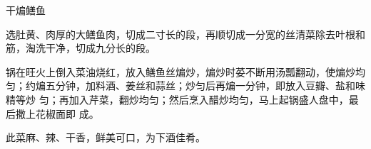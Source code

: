 %
%
%
%
%
%
%
\begin{recipe}{干煸鳝鱼}

\ingredients


\preparation

\step 选肚黄、肉厚的大鳝鱼肉，切成二寸长的段，再顺切成一分宽的丝清菜除去叶根和
筋，淘洗干净，切成九分长的段。

\step 锅在旺火上倒入菜油烧红，放入鳝鱼丝煸炒，煸炒时荽不断用汤瓢翻动，使煸炒均
匀；约煸五分钟，加料酒、姜丝和蒜丝；炒匀后再煸一分钟，即放入豆瓣、盐和味精等炒
匀；再加入芹菜，翻炒均匀；然后烹入醋炒均匀，马上起锅盛人盘中，最后撒上花椒面即
成。

\features

此菜麻、辣、干香，鲜美可口，为下酒佳肴。

\end{recipe}


